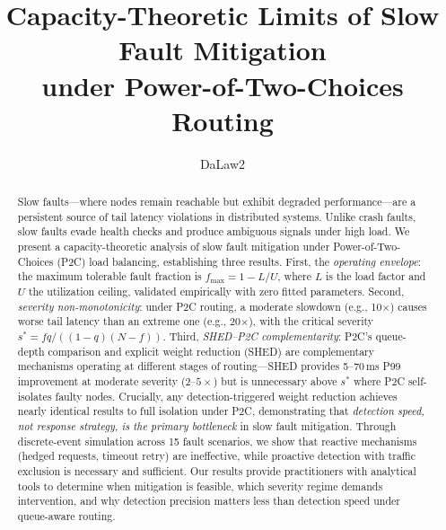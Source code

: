 \documentclass[11pt]{article}
\newcommand{\fmax}{f_{\max}}
\newcommand{\sstar}{s^{*}}
\begin{document}
\title{Capacity-Theoretic Limits of Slow Fault Mitigation\\under Power-of-Two-Choices Routing}
\author{DaLaw2}
\date{}
\maketitle

\begin{abstract}
Slow faults---where nodes remain reachable but exhibit degraded
performance---are a persistent source of tail latency violations in
distributed systems. Unlike crash faults, slow faults evade health checks
and produce ambiguous signals under high load. We present a
capacity-theoretic analysis of slow fault mitigation under
Power-of-Two-Choices (P2C) load balancing, establishing three results.
First, the \emph{operating envelope}: the maximum tolerable fault fraction
is $\fmax = 1 - L/U$, where $L$ is the load factor and $U$ the
utilization ceiling, validated empirically with zero fitted parameters.
Second, \emph{severity non-monotonicity}: under P2C routing, a moderate
slowdown (e.g., 10$\times$) causes worse tail latency than an extreme one
(e.g., 20$\times$), with the critical severity $\sstar =
fq/((1-q)(N-f))$. Third, \emph{SHED--P2C complementarity}: P2C's
queue-depth comparison and explicit weight reduction (SHED) are
complementary mechanisms operating at different stages of routing---SHED
provides 5--70\,ms P99 improvement at moderate severity ($2$--$5\times$)
but is unnecessary above $\sstar$ where P2C self-isolates faulty nodes.
Crucially, any detection-triggered weight reduction achieves nearly
identical results to full isolation under P2C, demonstrating that
\emph{detection speed, not response strategy, is the primary bottleneck}
in slow fault mitigation. Through discrete-event simulation across 15
fault scenarios, we show that reactive mechanisms (hedged requests, timeout
retry) are ineffective, while proactive detection with traffic exclusion is
necessary and sufficient. Our results provide practitioners with analytical
tools to determine when mitigation is feasible, which severity regime
demands intervention, and why detection precision matters less than
detection speed under queue-aware routing.
\end{abstract}












\end{document}

